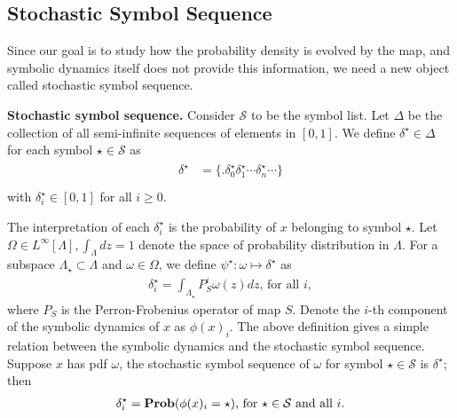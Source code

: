 \subsection{Stochastic Symbol Sequence}

Since our goal is to study how the probability density is evolved by the map, and symbolic dynamics
itself does not provide this information, we need a new object called stochastic symbol sequence.

\begin{definition} \textbf{Stochastic symbol sequence.}
Consider $\mathcal{S}$ to be the symbol list. Let $\Delta$ be the collection of all
semi-infinite sequences of elements in $[0,1]$. We define $\delta^\star \in \Delta$ for each
symbol $\star \in \mathcal{S}$ as
 \begin{align}
 \begin{split}
 \delta^\star &= \{.\delta_0^\star \delta_1^\star\cdots \delta_n^\star\cdots\} \\
 \end{split} 
 \end{align}
with $\delta^\star_i \in [0,1]$ for all $i\ge 0$.
\end{definition}


The interpretation of each $\delta_i^\star$ is the probability of $x$ belonging to
symbol $\star$. Let $\Omega\in L^\infty[\Lambda], \int_\Lambda dz=1$ denote the space of
probability distribution in $\Lambda$. For a subspace  $\Lambda_\star \subset \Lambda$ and
$\omega\in \Omega$, we define $\psi^\star: \omega \mapsto \delta^\star$ as
 \begin{eqnarray}
 \label{psidef}
    \delta^\star_i = \int_{\Lambda_\star} P^i_S \omega(z)dz \text{, for all }i,
 \end{eqnarray}
where $P_S$ is the Perron-Frobenius operator of map $S$. Denote the $i$-th component of the symbolic dynamics of $x$ as $\phi(x)_i$. The above definition gives a simple relation between the symbolic dynamics and the stochastic symbol sequence. Suppose $x$ has pdf $\omega$, the stochastic symbol sequence of $\omega$ for symbol $\star \in \mathcal{S}$ is $\delta^\star$; then
 \begin{eqnarray}
 \label{deltaistar}
  \delta_i^\star = \operatorname{\mathbf{Prob}}(\phi(x)_i = \star) \text{, for } \star\in \mathcal{S} \text{ and all }i.
 \end{eqnarray} 

